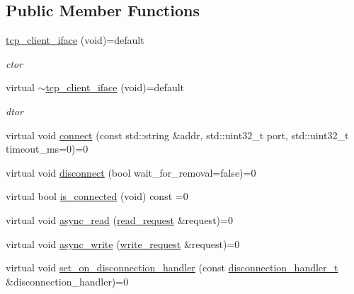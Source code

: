 \subsection*{Public Member Functions}
\begin{DoxyCompactItemize}
\item 
\mbox{\label{classcpp__redis_1_1network_1_1tcp__client__iface_a8504873049519bcebd626984e4087a90}} 
\mbox{\hyperlink{classcpp__redis_1_1network_1_1tcp__client__iface_a8504873049519bcebd626984e4087a90}{tcp\+\_\+client\+\_\+iface}} (void)=default
\begin{DoxyCompactList}\small\item\em ctor \end{DoxyCompactList}\item 
\mbox{\label{classcpp__redis_1_1network_1_1tcp__client__iface_a7381e8921118a13b5994101864906122}} 
virtual \mbox{\hyperlink{classcpp__redis_1_1network_1_1tcp__client__iface_a7381e8921118a13b5994101864906122}{$\sim$tcp\+\_\+client\+\_\+iface}} (void)=default
\begin{DoxyCompactList}\small\item\em dtor \end{DoxyCompactList}\item 
virtual void \mbox{\hyperlink{classcpp__redis_1_1network_1_1tcp__client__iface_a81ee982136e85b7c3401393341bc594c}{connect}} (const std\+::string \&addr, std\+::uint32\+\_\+t port, std\+::uint32\+\_\+t timeout\+\_\+ms=0)=0
\item 
virtual void \mbox{\hyperlink{classcpp__redis_1_1network_1_1tcp__client__iface_a024073fb3436d8fa99de8cad63418f6c}{disconnect}} (bool wait\+\_\+for\+\_\+removal=false)=0
\item 
virtual bool \mbox{\hyperlink{classcpp__redis_1_1network_1_1tcp__client__iface_a41ad0b43e3ab172828a3d2ce55d23893}{is\+\_\+connected}} (void) const =0
\item 
virtual void \mbox{\hyperlink{classcpp__redis_1_1network_1_1tcp__client__iface_ae1f9fa87002273a0caf340407bb68ade}{async\+\_\+read}} (\mbox{\hyperlink{structcpp__redis_1_1network_1_1tcp__client__iface_1_1read__request}{read\+\_\+request}} \&request)=0
\item 
virtual void \mbox{\hyperlink{classcpp__redis_1_1network_1_1tcp__client__iface_a9cd01e8a68479456d15d6435ffad9b92}{async\+\_\+write}} (\mbox{\hyperlink{structcpp__redis_1_1network_1_1tcp__client__iface_1_1write__request}{write\+\_\+request}} \&request)=0
\item 
virtual void \mbox{\hyperlink{classcpp__redis_1_1network_1_1tcp__client__iface_acecf3b75c3849071d82478bc7a8c97a8}{set\+\_\+on\+\_\+disconnection\+\_\+handler}} (const \mbox{\hyperlink{classcpp__redis_1_1network_1_1tcp__client__iface_a9a7d5942205db8be03da581a848b8ec0}{disconnection\+\_\+handler\+\_\+t}} \&disconnection\+\_\+handler)=0
\end{DoxyCompactItemize}


